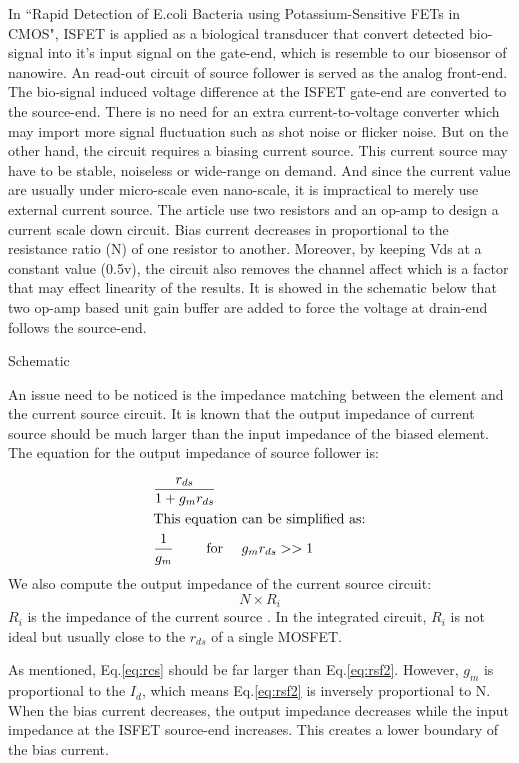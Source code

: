In ``Rapid Detection of E.coli Bacteria using Potassium-Sensitive FETs in CMOS", ISFET is applied as a biological transducer that convert detected bio-signal into it's input signal on the gate-end, which is resemble to our biosensor of nanowire.
An read-out circuit of source follower is served as the analog front-end.
The bio-signal induced voltage difference at the ISFET gate-end are converted to the source-end.
There is no need for an extra current-to-voltage converter which may import more signal fluctuation such as shot noise or flicker noise.
But on the other hand, the circuit requires a biasing current source.
This current source may have to be stable, noiseless or wide-range on demand.
And since the current value are usually under micro-scale even nano-scale, it is impractical to merely use external current source.
The article use two resistors and an op-amp to design a current scale down circuit.
Bias current decreases in proportional to the resistance ratio (N) of one resistor to another.
Moreover, by keeping Vds at a constant value (0.5v), the circuit also removes {\color{red}the channel affect which is a factor that may effect linearity of the results.}
It is showed in the schematic below that two op-amp based unit gain buffer are added to force the voltage at drain-end follows the source-end.

{\color{red} Schematic}

An issue need to be noticed is the impedance matching between the element and the current source circuit.
It is known that the output impedance of current source should be much larger than the input impedance of the biased element.
The equation for the output impedance of source follower is:

\begin{align}
    & \frac{r_{ds}}{1 + g_mr_{ds}}\\
\intertext{This equation can be simplified as:}
    & \frac{1}{g_m} \qquad \text{ for } \quad g_mr_{ds} >> 1 \label{eq:rsf2}
\end{align}
We also compute the output impedance of the current source circuit:
\begin{equation} \label{eq:rcs}
    N\times R_i
\end{equation}
$R_i$ is the impedance of the current source {\color{red}{I1 in Fig}}.
In the integrated circuit, $R_i$ is not ideal but usually close to the $r_{ds}$ of a single MOSFET.

As mentioned, Eq.\ref{eq:rcs} should be far larger than Eq.\ref{eq:rsf2}.
However, $g_m$ is proportional to the $I_d$, which means Eq.\ref{eq:rsf2} is inversely proportional to N.
When the bias current decreases, the output impedance decreases while the input impedance at the ISFET source-end increases.
This creates a lower boundary of the bias current.


